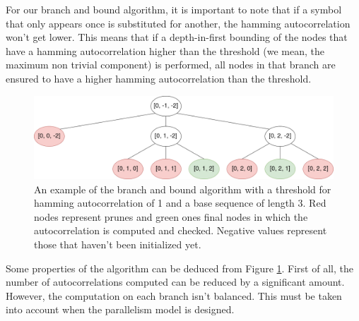   For our branch and bound algorithm, it is important to note that if a symbol
  that only appears once is substituted for another, the hamming
  autocorrelation won't get lower. This means that if a depth-in-first
  bounding of the nodes that have a hamming autocorrelation higher than the
  threshold (we mean, the maximum non trivial component) is performed,
  all nodes in that branch are ensured to have a higher hamming autocorrelation
  than the threshold.\\

  \begin{figure}[ht!]
    \begin{center}
      \includegraphics[scale=0.4]{Chapters/Implementation/Example_branch_bound.png}
    \end{center}
    \caption{An example of the branch and bound algorithm with a threshold for
    hamming autocorrelation of 1 and a base sequence of length 3. Red nodes
    represent prunes and green ones final nodes in which the
    autocorrelation is computed and checked. Negative values represent those
    that haven't been initialized yet.}
    \label{bb:fig:1}
  \end{figure}

  Some properties of the algorithm can be deduced from Figure \ref{bb:fig:1}.
  First of all, the number of autocorrelations computed can be reduced by a
  significant amount. However, the computation on each branch isn't balanced. This
  must be taken into account when the parallelism model is designed.
